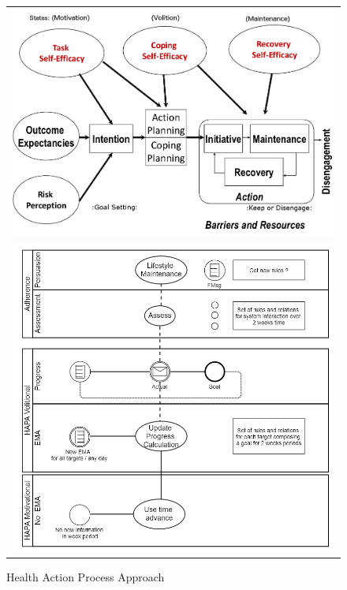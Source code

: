 \documentclass{llncs}
\begin{document}
\begin{figure}
  \begin{center}
  \begin{tabular}{c}
    \includegraphics[scale=0.4]{hapa_firem.png}\\
    \includegraphics[scale=0.4]{Hapa.png}\\
    \end{tabular}
    \caption{Health Action Process Approach \cite{rem2012}}
     \label{Fig.hapa}
\end{center}
\end{figure} 
\end{document}

